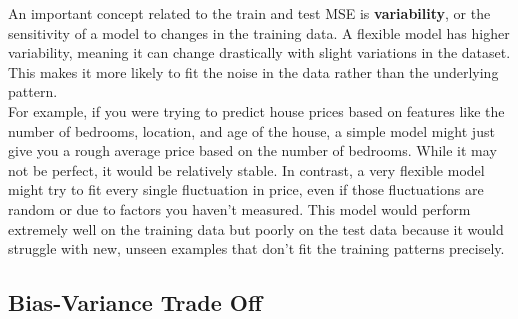 \begin{center}
\end{center}

An important concept related to the train and test MSE is \textbf{variability}, or the sensitivity of a model to changes in the training data. A flexible model has higher variability, meaning it can change drastically with slight variations in the dataset. This makes it more likely to fit the noise in the data rather than the underlying pattern.\\

For example, if you were trying to predict house prices based on features like the number of bedrooms, location, and age of the house, a simple model might just give you a rough average price based on the number of bedrooms. While it may not be perfect, it would be relatively stable. In contrast, a very flexible model might try to fit every single fluctuation in price, even if those fluctuations are random or due to factors you haven’t measured. This model would perform extremely well on the training data but poorly on the test data because it would struggle with new, unseen examples that don't fit the training patterns precisely.

\subsection{Bias-Variance Trade Off}

